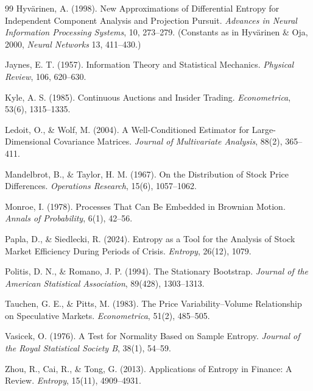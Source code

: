 \begin{thebibliography}{99}
 Hyvärinen, A. (1998). New Approximations of Differential Entropy for Independent Component Analysis and Projection Pursuit. \textit{Advances in Neural Information Processing Systems}, 10, 273--279. (Constants as in Hyvärinen \& Oja, 2000, \textit{Neural Networks} 13, 411--430.)

 Jaynes, E. T. (1957). Information Theory and Statistical Mechanics. \textit{Physical Review}, 106, 620--630.

 Kyle, A. S. (1985). Continuous Auctions and Insider Trading. \textit{Econometrica}, 53(6), 1315--1335.

 Ledoit, O., \& Wolf, M. (2004). A Well-Conditioned Estimator for Large-Dimensional Covariance Matrices. \textit{Journal of Multivariate Analysis}, 88(2), 365--411.

 Mandelbrot, B., \& Taylor, H. M. (1967). On the Distribution of Stock Price Differences. \textit{Operations Research}, 15(6), 1057--1062.

 Monroe, I. (1978). Processes That Can Be Embedded in Brownian Motion. \textit{Annals of Probability}, 6(1), 42--56.

 Papla, D., \& Siedlecki, R. (2024). Entropy as a Tool for the Analysis of Stock Market Efficiency During Periods of Crisis. \textit{Entropy}, 26(12), 1079.

 Politis, D. N., \& Romano, J. P. (1994). The Stationary Bootstrap. \textit{Journal of the American Statistical Association}, 89(428), 1303--1313.

 Tauchen, G. E., \& Pitts, M. (1983). The Price Variability--Volume Relationship on Speculative Markets. \textit{Econometrica}, 51(2), 485--505.

 Vasicek, O. (1976). A Test for Normality Based on Sample Entropy. \textit{Journal of the Royal Statistical Society B}, 38(1), 54--59.

 Zhou, R., Cai, R., \& Tong, G. (2013). Applications of Entropy in Finance: A Review. \textit{Entropy}, 15(11), 4909--4931.

\end{thebibliography}


